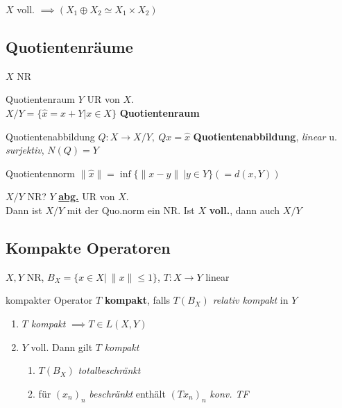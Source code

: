 \begin{bemerkung}
  $X$ voll. $\implies (X_1 \oplus X_2 \simeq X_1 \times X_2)$
\end{bemerkung}


\subsection{Quotientenräume}
$X$ NR

\begin{definition}{Quotientenraum}
  $Y$ UR von $X$.\\
  $X/Y = \{\hat{x} = x + Y| x\in X\}$ \textbf{Quotientenraum}
\end{definition}

\begin{definition}{Quotientenabbildung}
  $Q:X \to X/Y,\ Qx = \hat{x}$ \textbf{Quotientenabbildung},
  \textit{linear} u. \textit{surjektiv}, $N(Q) = Y$
\end{definition}

\begin{definition}{Quotientennorm}
  $\|\hat{x}\| = \inf\{\|x-y\|\ |y\in Y \} (= d(x,Y))$
\end{definition}

\begin{satz}{$X/Y$ NR?}
  $Y$ \textbf{\uline{abg.}} UR von $X$.\\
  Dann ist $X/Y$ mit der Quo.norm ein NR. Ist $X$ \textbf{voll.}, dann
  auch $X/Y$
\end{satz}


\subsection{Kompakte Operatoren}

$X,Y$ NR, $B_X=\{x \in X|\ \|x\| \leq 1\}$, $T:X \to Y$ linear

\begin{definition}{kompakter Operator}
  $T$ \textbf{kompakt}, falls $T(B_X)$ \textit{relativ kompakt} in $Y$
\end{definition}

\begin{bemerkung}
  \begin{enumerate}[label = (\roman*)]
    \item $T$ \textit{kompakt} $\implies T \in L(X,Y)$
    \item $Y$ voll. Dann gilt $T$ \textit{kompakt}
      \begin{enumerate}[label = $\Leftrightarrow$]
        \item $T(B_X)$ \textit{totalbeschränkt}
        \item für $(x_n)_n$ \textit{beschränkt} enthält
          $(Tx_n)_n$ \textit{konv. TF}
      \end{enumerate}
  \end{enumerate}
\end{bemerkung}

